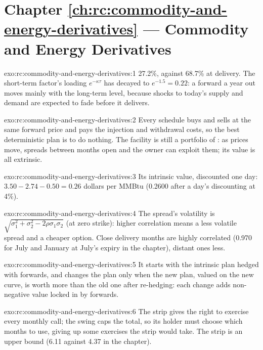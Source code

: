 \section*{Chapter \ref{ch:rc:commodity-and-energy-derivatives} --- Commodity and Energy Derivatives}

\begin{solution}{exo:rc:commodity-and-energy-derivatives:1}
27.2\%, against 68.7\% at delivery. The short-term factor's loading $e^{-\kappa\tau}$ has
decayed to $e^{-1.5} = 0.22$: a forward a year out moves mainly with the long-term level,
because shocks to today's supply and demand are expected to fade before it delivers.
\end{solution}

\begin{solution}{exo:rc:commodity-and-energy-derivatives:2}
Every schedule buys and sells at the same forward price and pays the injection and
withdrawal costs, so the best deterministic plan is to do nothing. The facility is still
a portfolio of : as prices move, spreads between months open and the owner
can exploit them; its value is all extrinsic.
\end{solution}

\begin{solution}{exo:rc:commodity-and-energy-derivatives:3}
Its intrinsic value, discounted one day: $3.50-2.74-0.50 = 0.26$ dollars per MMBtu
(0.2600 after a day's discounting at 4\%).
\end{solution}

\begin{solution}{exo:rc:commodity-and-energy-derivatives:4}
The spread's volatility is $\sqrt{\sigma_1^2+\sigma_2^2-2\rho\sigma_1\sigma_2}$ (at zero strike): higher correlation
means a less volatile spread and a cheaper option. Close delivery months are highly
correlated (0.970 for July and January at July's expiry in the chapter), distant ones less.
\end{solution}

\begin{solution}{exo:rc:commodity-and-energy-derivatives:5}
It starts with the intrinsic plan hedged with forwards, and changes the plan only when the
new plan, valued on the new curve, is worth more than the old one after re-hedging:
each change adds non-negative value locked in by forwards.
\end{solution}

\begin{solution}{exo:rc:commodity-and-energy-derivatives:6}
The strip gives the right to exercise every monthly call; the swing caps the total, so its
holder must choose which months to use, giving up some exercises the strip would take.
The strip is an upper bound (6.11 against 4.37 in the chapter).
\end{solution}

